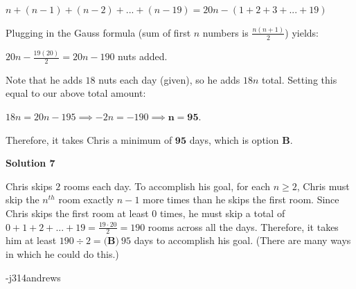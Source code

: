 \begin{enumerate}
 $n + (n - 1) + (n - 2) + ... + (n - 19) = 20n - (1 + 2 + 3 + ... + 19)$

 Plugging in the Gauss formula (sum of first $n$ numbers is $\frac{n(n + 1)}{2}$) yields:

 $20n - \frac{19(20)}{2} = 20n - 190$ nuts added.

 Note that he adds $18$ nuts each day (given), so he adds $18n$ total. Setting this equal to our above total amount:

 $18n = 20n - 195 \implies -2n = -190 \implies \mathbf{n = 95}$.

 Therefore, it takes Chris a minimum of $\boxed{\mathbf{95}}$ days, which is option $\textbf{B}$.

 



\textbf{Solution 7}

Chris skips $2$ rooms each day.  To accomplish his goal, for each $n \geq 2$, Chris must skip the $n^{th}$ room exactly $n-1$ more times than he skips the first room.  Since Chris skips the first room at least $0$ times, he must skip a total of $0+1+2+...+19 = \frac{19\cdot20}{2} = 190$ rooms across all the days.  Therefore, it takes him at least $190 \div 2 = \boxed{\textbf{(B)}\ 95}$ days to accomplish his goal.  (There are many ways in which he could do this.)

 -j314andrews

 


 


\end{enumerate}